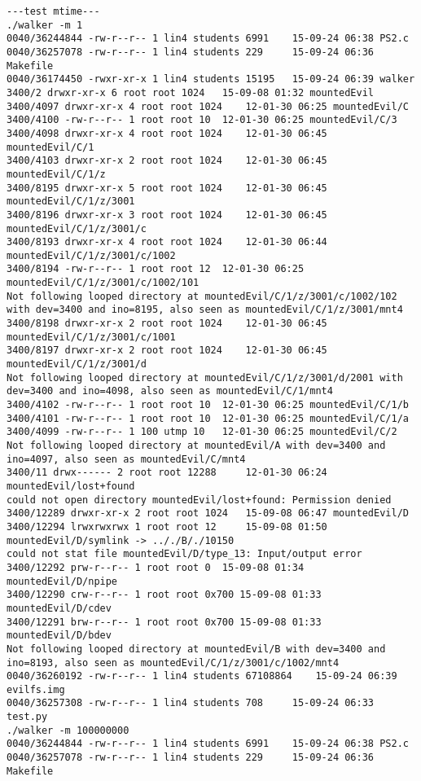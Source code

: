 \documentclass[12pt]{article}
\begin{document}
\begin{lstlisting}
---test mtime---
./walker -m 1
0040/36244844 -rw-r--r-- 1 lin4 students 6991	 15-09-24 06:38 PS2.c
0040/36257078 -rw-r--r-- 1 lin4 students 229	 15-09-24 06:36 Makefile
0040/36174450 -rwxr-xr-x 1 lin4 students 15195	 15-09-24 06:39 walker
3400/2 drwxr-xr-x 6 root root 1024	 15-09-08 01:32 mountedEvil
3400/4097 drwxr-xr-x 4 root root 1024	 12-01-30 06:25 mountedEvil/C
3400/4100 -rw-r--r-- 1 root root 10	 12-01-30 06:25 mountedEvil/C/3
3400/4098 drwxr-xr-x 4 root root 1024	 12-01-30 06:45 mountedEvil/C/1
3400/4103 drwxr-xr-x 2 root root 1024	 12-01-30 06:45 mountedEvil/C/1/z
3400/8195 drwxr-xr-x 5 root root 1024	 12-01-30 06:45 mountedEvil/C/1/z/3001
3400/8196 drwxr-xr-x 3 root root 1024	 12-01-30 06:45 mountedEvil/C/1/z/3001/c
3400/8193 drwxr-xr-x 4 root root 1024	 12-01-30 06:44 mountedEvil/C/1/z/3001/c/1002
3400/8194 -rw-r--r-- 1 root root 12	 12-01-30 06:25 mountedEvil/C/1/z/3001/c/1002/101
Not following looped directory at mountedEvil/C/1/z/3001/c/1002/102 with dev=3400 and ino=8195, also seen as mountedEvil/C/1/z/3001/mnt4
3400/8198 drwxr-xr-x 2 root root 1024	 12-01-30 06:45 mountedEvil/C/1/z/3001/c/1001
3400/8197 drwxr-xr-x 2 root root 1024	 12-01-30 06:45 mountedEvil/C/1/z/3001/d
Not following looped directory at mountedEvil/C/1/z/3001/d/2001 with dev=3400 and ino=4098, also seen as mountedEvil/C/1/mnt4
3400/4102 -rw-r--r-- 1 root root 10	 12-01-30 06:25 mountedEvil/C/1/b
3400/4101 -rw-r--r-- 1 root root 10	 12-01-30 06:25 mountedEvil/C/1/a
3400/4099 -rw-r--r-- 1 100 utmp 10	 12-01-30 06:25 mountedEvil/C/2
Not following looped directory at mountedEvil/A with dev=3400 and ino=4097, also seen as mountedEvil/C/mnt4
3400/11 drwx------ 2 root root 12288	 12-01-30 06:24 mountedEvil/lost+found
could not open directory mountedEvil/lost+found: Permission denied
3400/12289 drwxr-xr-x 2 root root 1024	 15-09-08 06:47 mountedEvil/D
3400/12294 lrwxrwxrwx 1 root root 12	 15-09-08 01:50 mountedEvil/D/symlink -> .././B/./10150
could not stat file mountedEvil/D/type_13: Input/output error
3400/12292 prw-r--r-- 1 root root 0	 15-09-08 01:34 mountedEvil/D/npipe
3400/12290 crw-r--r-- 1 root root 0x700 15-09-08 01:33 mountedEvil/D/cdev
3400/12291 brw-r--r-- 1 root root 0x700 15-09-08 01:33 mountedEvil/D/bdev
Not following looped directory at mountedEvil/B with dev=3400 and ino=8193, also seen as mountedEvil/C/1/z/3001/c/1002/mnt4
0040/36260192 -rw-r--r-- 1 lin4 students 67108864	 15-09-24 06:39 evilfs.img
0040/36257308 -rw-r--r-- 1 lin4 students 708	 15-09-24 06:33 test.py
./walker -m 100000000
0040/36244844 -rw-r--r-- 1 lin4 students 6991	 15-09-24 06:38 PS2.c
0040/36257078 -rw-r--r-- 1 lin4 students 229	 15-09-24 06:36 Makefile

\end{lstlisting}
\end{document}
